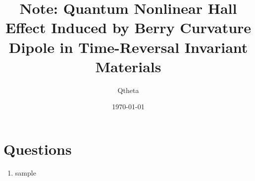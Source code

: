 \documentclass[]{article}
\begin{document}

\title{Note: Quantum Nonlinear Hall Effect Induced by Berry Curvature Dipole in Time-Reversal Invariant Materials}
\author{Qtheta}
\date{\today}

\maketitle

\tableofcontents
\newpage

\begin{abstract}


\end{abstract}
\section{Questions}
\begin{enumerate}
    \item sample 
 
\end{enumerate}

\end{document}
